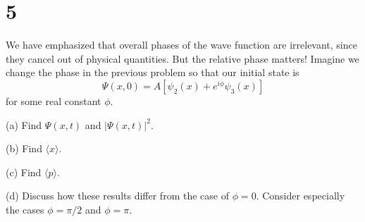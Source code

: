 \documentclass{article}
\begin{document}
\hfil

\section*{5}
\begin{ques}\label{q5}
We have emphasized that overall phases of the wave function are irrelevant, since they
cancel out of physical quantities. But the relative phase matters! Imagine we change the
phase in the previous problem so that our initial state is
\[
\Psi(x, 0) = A[\psi_2(x) + e^{i\phi}\psi_3(x)]
\]
for some real constant $\phi$.

(a) Find $\Psi(x, t)$ and $|\Psi(x, t)|^2$.

(b) Find $\langle x \rangle$.

(c) Find $\langle p \rangle$.

(d) Discuss how these results differ from the case of $\phi = 0$. Consider especially the cases
$\phi = \pi/2$ and $\phi = \pi$.
\end{ques}
\end{document}
